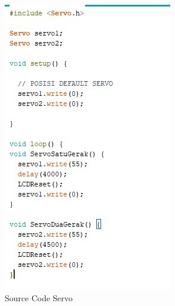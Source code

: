 \begin{enumerate}
\begin{figure}[!htbp]
\centering
\includegraphics[width=.75\textwidth]{figures/CONV/cservo.jpg}
\caption{Source Code Servo}\label{fig:cservo}
\end{figure}
\end{enumerate}

